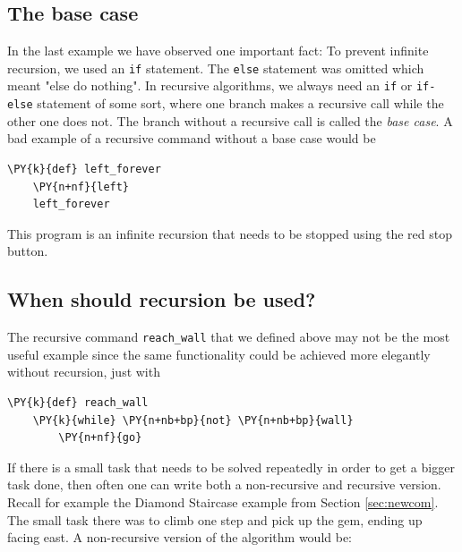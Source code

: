 \subsection[\ \ The base case]{The base case}

In the last example we have observed one important fact: To prevent infinite recursion, we 
used an {\tt if} statement. The {\tt else} statement was omitted which meant "else do nothing".
In recursive algorithms, we always need an {\tt if} or {\tt if-else} statement of some sort, 
where one branch makes a recursive call while the other one does not. 
The branch without a recursive call is called the {\em base case}. A bad example 
of a recursive command without a base case would be\\

\begin{bbox}
\begin{Verbatim}[commandchars=\\\{\}]
\PY{k}{def} left_forever
    \PY{n+nf}{left}
    left_forever
\end{Verbatim}
\end{bbox}
\vspace{6mm}

\noindent
This program is an infinite recursion that needs to be stopped using the 
red stop button.

\subsection[\ \ When should recursion be used?]{When should recursion be used?}

The recursive command {\tt reach\_wall} that we defined above may not be the most useful example 
since the same functionality could be achieved more elegantly without recursion, just with\\

\begin{bbox}
\begin{Verbatim}[commandchars=\\\{\}]
\PY{k}{def} reach_wall
    \PY{k}{while} \PY{n+nb+bp}{not} \PY{n+nb+bp}{wall}
        \PY{n+nf}{go}
\end{Verbatim}
\end{bbox}
\vspace{6mm}

\noindent
If there is a small task that needs to be solved repeatedly in order to get a bigger task done,
then often one can write both a non-recursive and recursive version. Recall for example the Diamond
Staircase example from Section \ref{sec:newcom}. The small task there was to climb one step and pick 
up the gem, ending up facing east. A non-recursive version of the algorithm would be:\\

